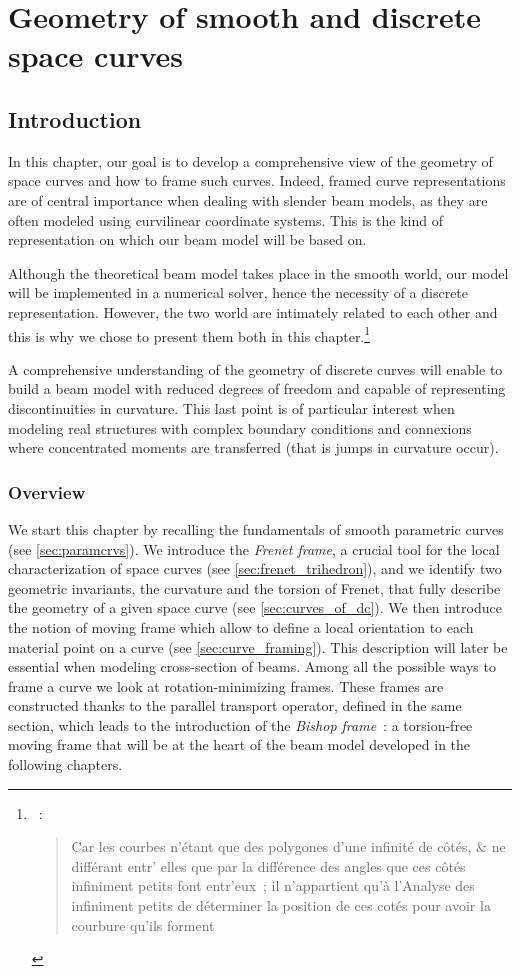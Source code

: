
\chapter{Geometry of smooth and discrete space curves}\label{chp:curve}
\section{Introduction}
In this chapter, our goal is to develop a comprehensive view of the geometry of space curves and how to frame such curves. Indeed, framed curve representations are of central importance when dealing with slender beam models, as they are often modeled using curvilinear coordinate systems. This is the kind of representation on which our beam model will be based on.

Although the theoretical beam model takes place in the smooth world, our model will be implemented in a numerical solver, hence the necessity of a discrete representation. However, the two world are intimately related to each other and this is why we chose to present them both in this chapter.\footnote{~: \blockquote{Car les courbes n’étant que des polygones d’une infinité de côtés, \& ne différant
entr' elles que par la différence des angles que ces côtés infiniment petits font
entr'eux~; il n’appartient qu’à l’Analyse des infiniment petits de déterminer la
position de ces cotés pour avoir la courbure qu’ils forment \belp{}}.}

A comprehensive understanding of the geometry of discrete curves will enable to build a beam model with reduced degrees of freedom and capable of representing discontinuities in curvature. This last point is of particular interest when modeling real structures with complex boundary conditions and connexions where concentrated moments are transferred (that is jumps in curvature occur).

\subsection{Overview}
We start this chapter by recalling the fundamentals of smooth parametric curves (see \cref{sec:paramcrvs}). We introduce the \emph{Frenet frame}, a crucial tool for the local characterization of space curves (see \cref{sec:frenet_trihedron}), and we identify two geometric invariants, the curvature and the torsion of Frenet, that fully describe the geometry of a given space curve (see \cref{sec:curves_of_dc}). We then introduce the notion of moving frame which allow to define a local orientation to each material point on a curve (see \cref{sec:curve_framing}). This description will later be essential when modeling cross-section of beams. Among all the possible ways to frame a curve we look at rotation-minimizing frames. These frames are constructed thanks to the parallel transport operator, defined in the same section, which leads to the introduction of the \emph{Bishop frame}~: a torsion-free moving frame that will be at the heart of the beam model developed in the following chapters.

